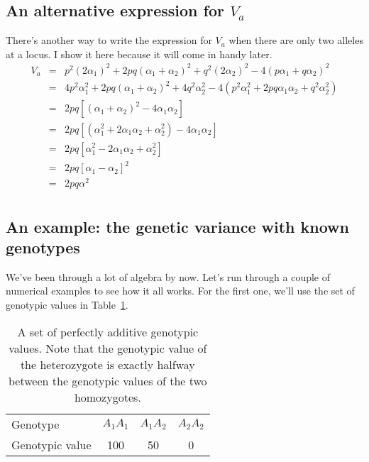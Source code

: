 \documentclass[12pt]{article}
\begin{document}
\subsection*{An alternative expression for $V_a$}

There's another way to write the expression for $V_a$ when there are
only two alleles at a locus. I show it here because it will come in
handy later.
\begin{eqnarray*}
V_a &=& p^2(2\alpha_1)^2 + 2pq(\alpha_1+\alpha_2)^2 + q^2(2\alpha_2)^2 -
        4(p\alpha_1+q\alpha_2)^2 \\
    &=& 4p^2\alpha_1^2 + 2pq(\alpha_1+\alpha_2)^2 + 4q^2\alpha_2^2
       - 4(p^2\alpha_1^2 +2pq\alpha_1\alpha_2 + q^2\alpha_2^2) \\
    &=& 2pq[(\alpha_1+\alpha_2)^2 - 4\alpha_1\alpha_2] \\
    &=& 2pq[(\alpha_1^2 + 2\alpha_1\alpha_2 + \alpha_2^2) - 4\alpha_1\alpha_2] \\
    &=& 2pq[\alpha_1^2 - 2\alpha_1\alpha_2 + \alpha_2^2] \\
    &=& 2pq[\alpha_1 - \alpha_2]^2 \\
    &=& 2pq\alpha^2 \\
\end{eqnarray*}

\subsection*{An example: the genetic variance with known genotypes}

We've been through a lot of algebra by now. Let's run through a couple
of numerical examples to see how it all works. For the first one,
we'll use the set of genotypic values in Table~\ref{table:additive}.

\begin{table}
\begin{center}
\begin{tabular}{l|ccc}
\hline\hline
Genotype        & $A_1A_1$ & $A_1A_2$ & $A_2A_2$ \\
Genotypic value &  100       & 50        & 0 \\
\hline
\end{tabular}
\end{center}
\caption{A set of perfectly additive genotypic values. Note that the
  genotypic value of the heterozygote is exactly halfway between the
  genotypic values of the two homozygotes.}\label{table:additive}
\end{table}
\end{document}
